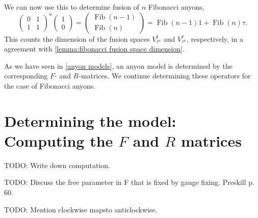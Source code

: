 \documentclass[a4paper,10pt,oneside]{book}
\theoremstyle{plain}
\theoremstyle{definition}
\theoremstyle{remark}
\DeclareMathOperator{\Fib}{Fib}
\begin{document}
We can now use this to determine fusion of $n$ Fibonacci anyons,
\begin{equation}
  \begin{pmatrix}
    0 & 1 \\
    1 & 1
  \end{pmatrix}^n
  \begin{pmatrix}
    1 \\ 0
  \end{pmatrix} =
  \begin{pmatrix}
    \Fib(n-1) \\ \Fib(n)
  \end{pmatrix}
  = \Fib(n-1) 1 + \Fib(n) \tau.
\end{equation}
This counts the dimension of the fusion spaces $V_{\tau^n}^1$ and $V_{\tau^n}^\tau$, respectively, in a agreement with \cref{lemma:fibonacci fusion space dimension}.


As we have seen in \cref{anyon models}, an anyon model is determined by the corresponding $F$- and $R$-matrices. We continue determining these operators for the case of Fibonacci anyons.






\section{Determining the model: Computing the \texorpdfstring{$F$}{F} and \texorpdfstring{$R$}{R} matrices}

TODO: Write down computation.

TODO: Discuss the free parameter in F that is fixed by gauge fixing. Preskill p. 60.

TODO: Mention clockwise mapsto anticlockwise.

\end{document}
